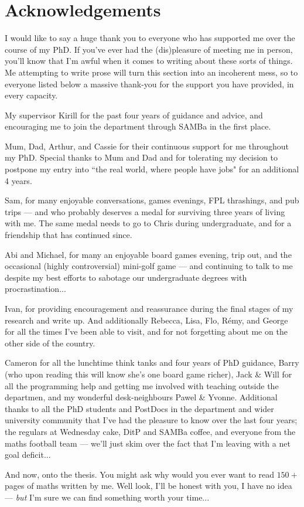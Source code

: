 \chapter*{Acknowledgements}
I would like to say a huge thank you to everyone who has supported me over the course of my PhD.
If you've ever had the (dis)pleasure of meeting me in person, you'll know that I'm awful when it comes to writing about these sorts of things.
Me attempting to write prose will turn this section into an incoherent mess, so to everyone listed below a massive thank-you for the support you have provided, in every capacity.

My supervisor Kirill for the past four years of guidance and advice, and encouraging me to join the department through SAMBa in the first place.

Mum, Dad, Arthur, and Cassie for their continuous support for me throughout my PhD.
Special thanks to Mum and Dad and for tolerating my decision to postpone my entry into ``the real world, where people have jobs" for an additional 4 years.

Sam, for many enjoyable conversations, games evenings, FPL thrashings, and pub trips --- and who probably deserves a medal for surviving three years of living with me. 
The same medal needs to go to Chris during undergraduate, and for a friendship that has continued since.

Abi and Michael, for many an enjoyable board games evening, trip out, and the occasional (highly controversial) mini-golf game --- and continuing to talk to me despite my best efforts to sabotage our undergraduate degrees with procrastination...

Ivan, for providing encouragement and reassurance during the final stages of my research and write up. 
And additionally Rebecca, Lisa, Flo, R\'{e}my, and George for all the times I've been able to visit, and for not forgetting about me on the other side of the country.

Cameron for all the lunchtime think tanks and four years of PhD guidance, Barry (who upon reading this will know she's one board game richer), Jack \& Will for all the programming help and getting me involved with teaching outside the departmen, and my wonderful desk-neighbours Pawel \& Yvonne.
Additional thanks to all the PhD students and PostDocs in the department and wider university community that I've had the pleasure to know over the last four years; the regulars at Wednesday cake, DitP and SAMBa coffee, and everyone from the maths football team --- we'll just skim over the fact that I'm leaving with a net goal deficit... 

And now, onto the thesis.
You might ask why would you ever want to read $150+$ pages of maths written by me.
Well look, I'll be honest with you, I have no idea --- \emph{but} I'm sure we can find something worth your time...